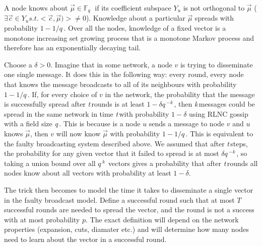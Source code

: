 \documentclass{article} %
\def\graphtime{\textit{t}\,}
\def\numMessages{\textit{k}\,}
\def\fieldSize{\textit{q}\,}
\def\field{\mathbb{F}_{\fieldSize}\,}
\begin{document}
A node knows about $\vec{\mu} \in \field$ if its coefficient subspace $Y_u$ is not orthogonal to $\vec{\mu}$ ($\exists \vec{c} \in Y_u s.t. < \vec{c}, \vec{\mu}) > \neq 0$). Knowledge about a particular $\vec{\mu}$ spreads with probability $1 - 1/\fieldSize$. Over all the nodes, knowledge of a fixed vector is a monotone increasing set growing process that is a monotone Markov process and therefore has an exponentially decaying tail. 

Choose a $\delta > 0$. Imagine that in some network, a node $v$ is trying to disseminate one single message. It does this in the following way: every round, every node that knows the message broadcasts to all of its neighbours with probability $1 - 1/\fieldSize$. If, for every choice of $v$ in the network, the probability that the message is successfully spread after \graphtime rounds is at least $1-\delta\fieldSize^{-\numMessages}$, then \numMessages messages could be spread in the same network in time \graphtime with probability $1-\delta$ using RLNC gossip with a field size \fieldSize. This is because is a node $u$ sends a message to node $v$ and $u$ knows $\vec{\mu}$, then $v$ will now know $\vec{\mu}$ with probability $1-1/\fieldSize$. This is equivalent to the faulty broadcasting system described above. We assumed that after \graphtime steps, the probability for any given vector that it failed to spread is at most $\delta\fieldSize^{-\numMessages}$, so taking a union bound over all $\fieldSize^{\numMessages}$ vectors gives a probability that after \graphtime rounds all nodes know about all vectors with probability at least $1-\delta$.

The trick then becomes to model the time it takes to disseminate a single vector in the faulty broadcast model. Define a successful round such that at most $T$ successful rounds are needed to spread the vector, and the round is not a success with at most probability $p$. The exact definition will depend on the network properties (expansion, cuts, diamater etc.) and will determine how many nodes need to learn about the vector in a successful round.  
\end{document}
